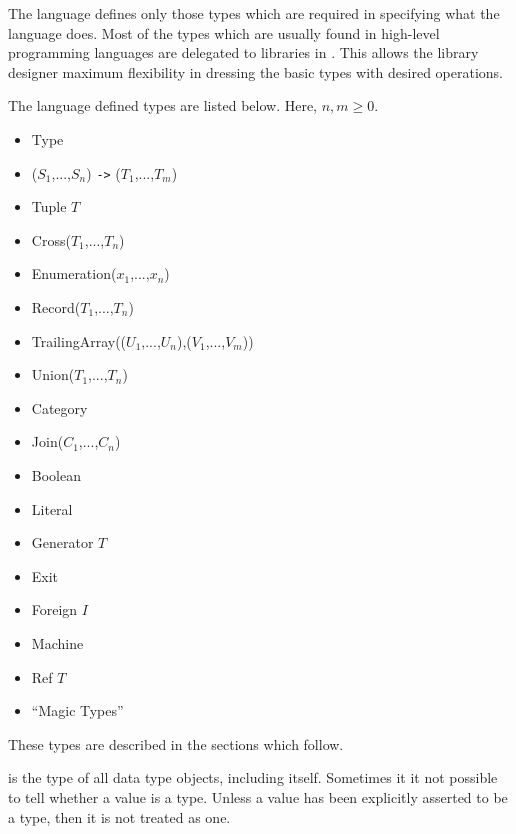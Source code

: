 
The \asharp{} language defines only those types which
are required in specifying what the language does.  
Most of the types which are usually found in high-level programming languages
are delegated to libraries in \asharp{}.  This allows the library designer
maximum flexibility in dressing the basic types with desired operations.

The language defined types are listed below.
Here, $n, m \geq 0$.
\begin{itemize}
\item Type
\item ($S_1$,...,$S_n$) {\tt ->} ($T_1$,...,$T_m$)
\item Tuple $T$
\item Cross($T_1$,...,$T_n$)
\item Enumeration($x_1$,...,$x_n$)
\item Record($T_1$,...,$T_n$)
\item TrailingArray(($U_1$,...,$U_n$),($V_1$,...,$V_m$))
\item Union($T_1$,...,$T_n$)
\item Category
\item Join($C_1$,...,$C_n$)
\item Boolean
\item Literal
\item Generator $T$
\item Exit
\item Foreign $I$
\item Machine
\item Ref $T$
\item ``Magic Types''
\end{itemize}
These types are described in the sections which follow.

%
%
%
 is the type of all data type objects, including itself.
Sometimes it it not possible to tell whether a value is a type.
Unless a value has been explicitly asserted to be a type, then
it is not treated as one.

